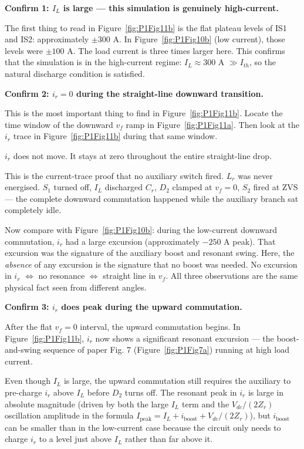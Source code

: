 \documentclass[12pt, a4paper]{article}
\def\,{ }%
\newcommand{\Vdc}{V_{dc}}
\newcommand{\vf}{v_f}
\newcommand{\ir}{i_r}
\newcommand{\IL}{I_L}
\newcommand{\Lr}{L_r}
\newcommand{\Zr}{Z_r}
\newcommand{\Ith}{I_{th}}
\newcommand{\figref}[1]{Figure~\ref{#1}}
\begin{document}
\textbf{Confirm 1: $\IL$ is large --- this simulation is genuinely
high-current.}

The first thing to read in \figref{fig:P1Fig11b} is the flat plateau levels
of IS1 and IS2: approximately $\pm 300$\,A.
In \figref{fig:P1Fig10b} (low current), those levels were $\pm 100$\,A.
The load current is three times larger here.
This confirms that the simulation is in the high-current regime: $\IL \approx
300$\,A $\gg \Ith$, so the natural discharge condition is satisfied.

\medskip
\textbf{Confirm 2: $\ir = 0$ during the straight-line downward transition.}

This is the most important thing to find in \figref{fig:P1Fig11b}.
Locate the time window of the downward $\vf$ ramp in \figref{fig:P1Fig11a}.
Then look at the $\ir$ trace in \figref{fig:P1Fig11b} during that same
window.

$\ir$ does not move.
It stays at zero throughout the entire straight-line drop.

This is the current-trace proof that no auxiliary switch fired.
$\Lr$ was never energised.
$S_1$ turned off, $\IL$ discharged $C_r$, $D_2$ clamped at $\vf = 0$,
$S_2$ fired at ZVS --- the complete downward commutation happened while the
auxiliary branch sat completely idle.

Now compare with \figref{fig:P1Fig10b}: during the low-current downward
commutation, $\ir$ had a large excursion (approximately $-250$\,A peak).
That excursion was the signature of the auxiliary boost and resonant swing.
Here, the \emph{absence} of any excursion is the signature that no boost
was needed.
No excursion in $\ir$ $\Longleftrightarrow$ no resonance $\Longleftrightarrow$
straight line in $\vf$.
All three observations are the same physical fact seen from different
angles.

\medskip
\textbf{Confirm 3: $\ir$ does peak during the upward commutation.}

After the flat $\vf = 0$ interval, the upward commutation begins.
In \figref{fig:P1Fig11b}, $\ir$ now shows a significant resonant excursion
--- the boost-and-swing sequence of paper Fig.\,7 (\figref{fig:P1Fig7a})
running at high load current.

Even though $\IL$ is large, the upward commutation still requires the
auxiliary to pre-charge $\ir$ above $\IL$ before $D_2$ turns off.
The resonant peak in $\ir$ is large in absolute magnitude (driven by both
the large $\IL$ term and the $\Vdc/(2\Zr)$ oscillation amplitude in the
formula $I_\text{peak} = \IL + i_\text{boost} + \Vdc/(2\Zr)$), but
$i_\text{boost}$ can be smaller than in the low-current case because the
circuit only needs to charge $\ir$ to a level just above $\IL$ rather than
far above it.
\end{document}
